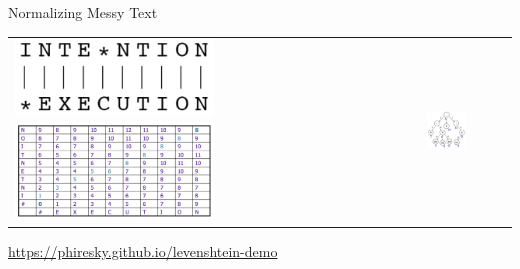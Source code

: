 \documentclass[10pt]{beamer}
\begin{document}
\begin{frame}{Normalizing Messy Text}

\begin{tabular}{p{5cm} p{7cm}}
    \vspace{0pt}
    \includegraphics[width=0.5\textwidth]{figures/string-alignment.png}
	  \vspace{0pt}
    \includegraphics[width=0.5\textwidth]{figures/edit-distance-table.png}
    &
    \vspace{0pt}
    \includegraphics[width=0.5\textwidth]{figures/trie-example.png}
\end{tabular}

\begin{center}
  \textcolor{blue}{\url{https://phiresky.github.io/levenshtein-demo}}
\end{center}

\end{frame}
\end{document}
